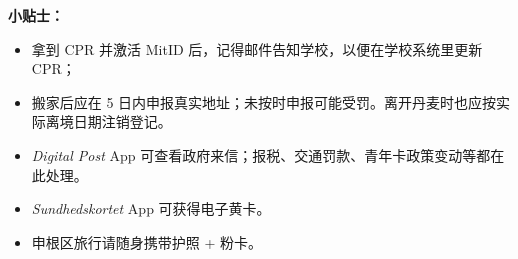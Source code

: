\begin{grayleftbox}{\textbf{小贴士： }}
  \begin{itemize}
    \item 拿到 CPR 并激活 MitID 后，记得邮件告知学校，以便在学校系统里更新CPR；
    \item 搬家后应在 5 日内申报真实地址；未按时申报可能受罚。离开丹麦时也应按实际离境日期注销登记。
    \item \textit{Digital Post} App 可查看政府来信；报税、交通罚款、青年卡政策变动等都在此处理。
    \item \textit{Sundhedskortet} App 可获得电子黄卡。
    \item 申根区旅行请随身携带护照 + 粉卡。
  \end{itemize}
\end{grayleftbox}





